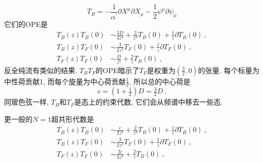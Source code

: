 \begin{equation}
    T_{B}=-\frac{1}{\alpha^{\prime}}\partial X^{\mu}\partial X_{\mu}-\frac{1}{2}\psi^{\mu}\partial\psi_{\mu}
\end{equation}
它们的OPE是
\begin{subequations}
\begin{align}
    T_{B}(z)T_{B}(0)&\sim \frac{3D}{4z^{4}}+\frac{2}{z^{2}}T_{B}(0)+\frac{1}{z}\partial T_{B}(0)\:,\label{10.1.13a}\\
    T_{B}(z)T_{F}(0)&\sim \frac{3}{2z^{2}}T_{F}(0)+\frac{1}{z}\partial T_{F}(0)\:,\label{10.1.13b}\\
    T_{F}(z)T_{F}(0)&\sim \frac{D}{z^{3}}+\frac{2}{z}T_{B}(0) \:,\label{10.1.13c}
\end{align}
\end{subequations}
反全纯流有类似的结果. $T_{B}T_{F}$的OPE暗示了$T_{F}$是权重为$(\frac{3}{2},0)$的张量. 每个标量为中性荷贡献1, 而每个旋量为中心荷贡献$\frac{1}{2}$, 所以总的中心荷是
\begin{equation}
    c=(1+\tfrac{1}{2})D=\tfrac{3}{2}D\:.\label{10.1.14}
\end{equation}
同玻色弦一样, $T_{B}$和$T_{F}$是态上的约束代数, 它们会从频谱中移去一些态.

更一般的$N=1$超共形代数是
\begin{subequations}
\begin{align}
    T_{B}(z)T_{B}(0)&\sim \frac{c}{2z^{4}}+\frac{2}{z^{2}}T_{B}(0)+\frac{1}{z}\partial T_{B}(0)\:,\label{10.1.15a}\\
    T_{B}(z)T_{F}(0)&\sim \frac{3}{2z^{2}}T_{F}(0)+\frac{1}{z}\partial T_{F}(0)\:,\label{10.1.15b}\\
    T_{F}(z)T_{F}(0)&\sim \frac{2c}{3z^{3}}+\frac{2}{z}T_{B}(0) \:,\label{10.1.15c}
\end{align}
\end{subequations}

